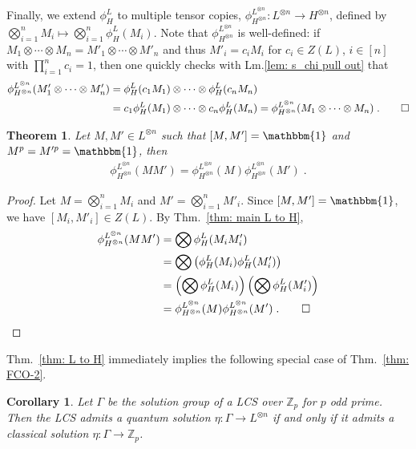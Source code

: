 \documentclass[aps,pra,letterpaper,onrcolumn,nofootinbib,notitlepage,longbibliography]{revtex4-1}
\newtheorem{theorem}{Theorem}
\newtheorem{corollary}{Corollary}
\newcommand{\one}{\mathbbm{1}}
\newcommand{\ra}{\ensuremath{\rightarrow}}
\newcommand{\zz}{\mathbb Z}
\begin{document}
Finally, we extend $\phi^L_H$ to multiple tensor copies, $\phi^{L^{\otimes n}}_{H^{\otimes n}}:L^{\otimes n}\to H^{\otimes n}$, defined by $\bigotimes_{i=1}^nM_i\mapsto \bigotimes_{i=1}^n\phi^L_H(M_i)$. Note that $\phi^{L^{\otimes n}}_{H^{\otimes n}}$ is well-defined: if $M_1\otimes\cdots\otimes M_n=M'_1\otimes \cdots\otimes M'_n$ and thus $M'_i=c_iM_i$ for $c_i\in Z(L)$, $i\in[n]$ with $\prod_{i=1}^n c_i=1$, then one quickly checks with Lm.\ref{lem: s_chi pull out} that
\begin{align*}
    \phi^{L^{\otimes n}}_{H^{\otimes n}}(M'_1\otimes \cdots \otimes M'_n)
    &=\phi^L_H(c_1M_1)\otimes\cdots\otimes \phi^L_H(c_nM_n)\\
    &=c_1\phi^L_H(M_1)\otimes\cdots\otimes c_n\phi^L_H(M_n)
    =\phi^{L^{\otimes n}}_{H^{\otimes n}}(M_1\otimes\cdots\otimes M_n)\; .\qedhere
\end{align*}

\begin{theorem}{\label{thm: L to H}}
    Let $M,M'\in L^{\otimes n}$ such that $[M,M']=\one$ and $M^p=M'^p=\one$, then
    \begin{align*}
        \phi^{L^{\otimes n}}_{H^{\otimes n}}(MM'
        )
        =\phi^{L^{\otimes n}}_{H^{\otimes n}}(M)\phi^{L^{\otimes n}}_{H^{\otimes n}}(M')\; .
    \end{align*}
\end{theorem}

\begin{proof}
    Let $M=\bigotimes_{i=1}^nM_i$ and $M'=\bigotimes_{i=1}^nM'_i$. Since $[M,M']=\one$, we have $[M_i,M'_i]\in Z(L)$. By Thm.~\ref{thm: main L to H},
    \begin{align*}
        \phi^{L^{\otimes n}}_{H^{\otimes n}}(MM')
        &=\bigotimes \phi^{L}_{H}(M_iM'_i)\\
        &=\bigotimes \left(\phi^{L}_{H}(M_i)\phi^{L}_{H}(M'_i)\right)\\
        &=\left(\bigotimes \phi^{L}_{H}(M_i)\right)\left(\bigotimes \phi^{L}_{H}(M'_i)\right)\\
        &=\phi^{L^{\otimes n}}_{H^{\otimes n}}(M)\phi^{L^{\otimes n}}_{H^{\otimes n}}(M')\; .\qedhere
    \end{align*}
\end{proof}

Thm.~\ref{thm: L to H} immediately implies the following special case of Thm.~\ref{thm: FCO-2}.

\begin{corollary}\label{cor: no qsol for L}
    Let $\Gamma$ be the solution group of a LCS over $\zz_p$ for $p$ odd prime. Then the LCS admits a quantum solution $\eta: \Gamma \ra L^{\otimes n}$ if and only if it admits a classical solution $\eta: \Gamma \ra \zz_p$.
\end{corollary}
\end{document}
